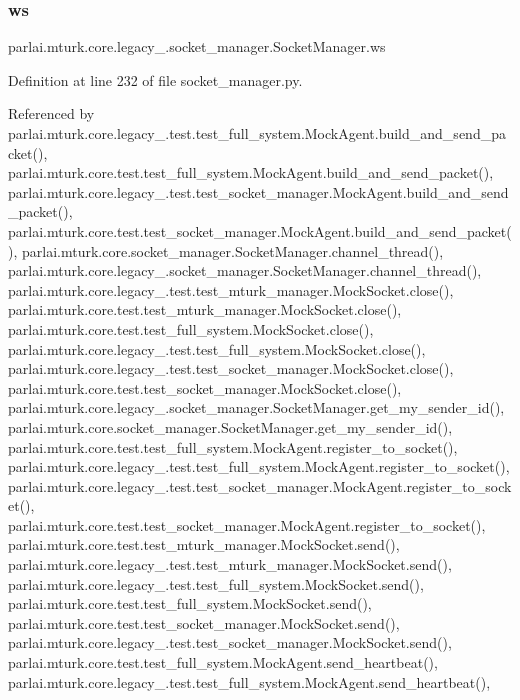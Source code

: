 \subsubsection{\texorpdfstring{ws}{ws}}
{\footnotesize\ttfamily parlai.\+mturk.\+core.\+legacy\+\_.\+socket\+\_\+manager.\+Socket\+Manager.\+ws}



Definition at line 232 of file socket\+\_\+manager.\+py.



Referenced by parlai.\+mturk.\+core.\+legacy\+\_.\+test.\+test\+\_\+full\+\_\+system.\+Mock\+Agent.\+build\+\_\+and\+\_\+send\+\_\+packet(), parlai.\+mturk.\+core.\+test.\+test\+\_\+full\+\_\+system.\+Mock\+Agent.\+build\+\_\+and\+\_\+send\+\_\+packet(), parlai.\+mturk.\+core.\+legacy\+\_.\+test.\+test\+\_\+socket\+\_\+manager.\+Mock\+Agent.\+build\+\_\+and\+\_\+send\+\_\+packet(), parlai.\+mturk.\+core.\+test.\+test\+\_\+socket\+\_\+manager.\+Mock\+Agent.\+build\+\_\+and\+\_\+send\+\_\+packet(), parlai.\+mturk.\+core.\+socket\+\_\+manager.\+Socket\+Manager.\+channel\+\_\+thread(), parlai.\+mturk.\+core.\+legacy\+\_.\+socket\+\_\+manager.\+Socket\+Manager.\+channel\+\_\+thread(), parlai.\+mturk.\+core.\+legacy\+\_.\+test.\+test\+\_\+mturk\+\_\+manager.\+Mock\+Socket.\+close(), parlai.\+mturk.\+core.\+test.\+test\+\_\+mturk\+\_\+manager.\+Mock\+Socket.\+close(), parlai.\+mturk.\+core.\+test.\+test\+\_\+full\+\_\+system.\+Mock\+Socket.\+close(), parlai.\+mturk.\+core.\+legacy\+\_.\+test.\+test\+\_\+full\+\_\+system.\+Mock\+Socket.\+close(), parlai.\+mturk.\+core.\+legacy\+\_.\+test.\+test\+\_\+socket\+\_\+manager.\+Mock\+Socket.\+close(), parlai.\+mturk.\+core.\+test.\+test\+\_\+socket\+\_\+manager.\+Mock\+Socket.\+close(), parlai.\+mturk.\+core.\+legacy\+\_.\+socket\+\_\+manager.\+Socket\+Manager.\+get\+\_\+my\+\_\+sender\+\_\+id(), parlai.\+mturk.\+core.\+socket\+\_\+manager.\+Socket\+Manager.\+get\+\_\+my\+\_\+sender\+\_\+id(), parlai.\+mturk.\+core.\+test.\+test\+\_\+full\+\_\+system.\+Mock\+Agent.\+register\+\_\+to\+\_\+socket(), parlai.\+mturk.\+core.\+legacy\+\_.\+test.\+test\+\_\+full\+\_\+system.\+Mock\+Agent.\+register\+\_\+to\+\_\+socket(), parlai.\+mturk.\+core.\+legacy\+\_.\+test.\+test\+\_\+socket\+\_\+manager.\+Mock\+Agent.\+register\+\_\+to\+\_\+socket(), parlai.\+mturk.\+core.\+test.\+test\+\_\+socket\+\_\+manager.\+Mock\+Agent.\+register\+\_\+to\+\_\+socket(), parlai.\+mturk.\+core.\+test.\+test\+\_\+mturk\+\_\+manager.\+Mock\+Socket.\+send(), parlai.\+mturk.\+core.\+legacy\+\_.\+test.\+test\+\_\+mturk\+\_\+manager.\+Mock\+Socket.\+send(), parlai.\+mturk.\+core.\+legacy\+\_.\+test.\+test\+\_\+full\+\_\+system.\+Mock\+Socket.\+send(), parlai.\+mturk.\+core.\+test.\+test\+\_\+full\+\_\+system.\+Mock\+Socket.\+send(), parlai.\+mturk.\+core.\+test.\+test\+\_\+socket\+\_\+manager.\+Mock\+Socket.\+send(), parlai.\+mturk.\+core.\+legacy\+\_.\+test.\+test\+\_\+socket\+\_\+manager.\+Mock\+Socket.\+send(), parlai.\+mturk.\+core.\+test.\+test\+\_\+full\+\_\+system.\+Mock\+Agent.\+send\+\_\+heartbeat(), parlai.\+mturk.\+core.\+legacy\+\_.\+test.\+test\+\_\+full\+\_\+system.\+Mock\+Agent.\+send\+\_\+heartbeat(), 